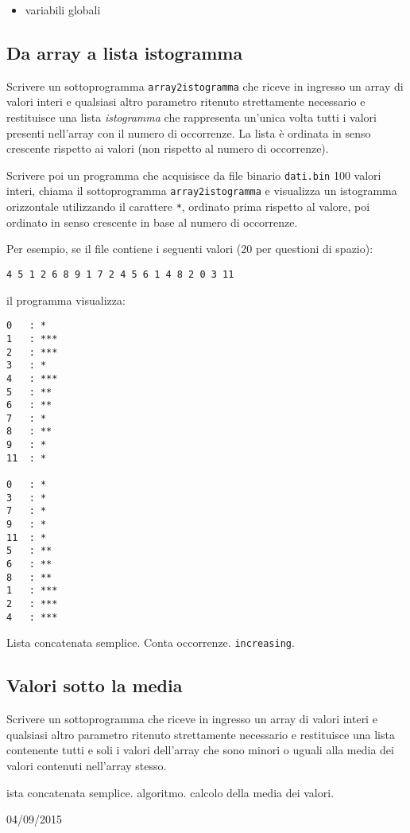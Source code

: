 \begin{itemize}
\item variabili globali
\end{itemize}

\mysep{}

\subsection{Da array a lista istogramma}
Scrivere un sottoprogramma \texttt{array2istogramma} che riceve in ingresso un array di valori interi e qualsiasi altro parametro ritenuto strettamente necessario e restituisce una lista \textit{istogramma} che rappresenta un'unica volta tutti i valori presenti nell'array con il numero di occorrenze. La lista \`e ordinata in senso crescente rispetto ai valori (non rispetto al numero di occorrenze).

Scrivere poi un programma che acquisisce da file binario \texttt{dati.bin} 100 valori interi, chiama il sottoprogramma \texttt{array2istogramma} e visualizza un istogramma orizzontale utilizzando il carattere \texttt{*}, ordinato prima rispetto al valore, poi ordinato in senso crescente in base al numero di occorrenze.

Per esempio, se il file contiene i seguenti valori (20 per questioni di spazio):

\begin{verbatim}
4 5 1 2 6 8 9 1 7 2 4 5 6 1 4 8 2 0 3 11
\end{verbatim}

il programma visualizza:

\begin{verbatim}
0	: *
1	: ***
2	: ***
3	: *
4	: ***
5	: **
6	: **
7	: *
8	: **
9	: *
11	: *

0	: *
3	: *
7	: *
9	: *
11	: *
5	: **
6	: **
8	: **
1	: ***
2	: ***
4	: ***
\end{verbatim}

\begin{tags}
Lista concatenata semplice. Conta occorrenze.
\texttt{increasing}.
\end{tags}


\subsection{Valori sotto la media}
Scrivere un sottoprogramma che riceve in ingresso un array di valori interi e qualsiasi altro parametro ritenuto strettamente necessario e restituisce una lista contenente tutti e soli i valori dell'array che sono minori o uguali alla media dei valori contenuti nell'array stesso.

\begin{tags}
ista concatenata semplice. algoritmo. calcolo della media dei valori.
\end{tags}

\begin{esame}
04/09/2015
\end{esame}


 

